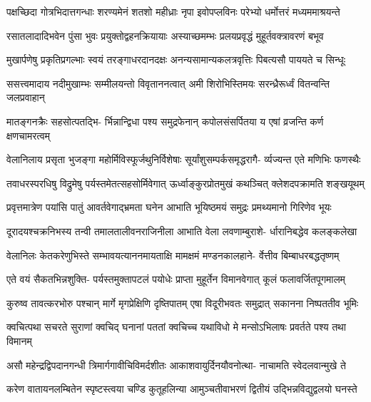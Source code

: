 \fourlineindentedshloka
{पक्षच्छिदा गोत्रभिदात्तगन्धाः}
{शरण्यमेनं शतशो महीध्राः}
{नृपा इवोपप्लविनः परेभ्यो}
{धर्मोत्तरं मध्यममाश्रयन्ते} %

\fourlineindentedshloka
{रसातलादादिभवेन पुंसा}
{भुवः प्रयुक्तोद्वहनक्रियायाः}
{अस्याच्छमम्भः प्रलयप्रवृद्धं}
{मुहूर्तवक्त्रावरणं बभूव} %

\fourlineindentedshloka
{मुखार्पणेषु प्रकृतिप्रगल्भाः}
{स्वयं तरङ्गाधरदानदक्षः}
{अनन्यसामान्यकलत्रवृत्तिः}
{पिबत्यसौ पाययते च सिन्धूः} %

\twolineshloka
{ससत्त्वमादाय नदीमुखाम्भः सम्मीलयन्तो विवृताननत्वात्}
{अमी शिरोभिस्तिमयः सरन्ध्रैरूर्ध्वं वितन्वन्ति जलप्रवाहान्} %

\fourlineindentedshloka
{मातङ्गनक्रैः सहसोत्पतद्भि-}
{र्भिन्नान्द्विधा पश्य समुद्रफेनान्}
{कपोलसंसर्पितया य एषां}
{व्रजन्ति कर्ण क्षणचामरत्वम्} %

\fourlineindentedshloka
{वेलानिलाय प्रसृता भुजङ्गा}
{महोर्मिविस्फूर्जथुनिर्विशेषाः}
{सूर्यांशुसम्पर्कसमृद्धरागै-}
{र्व्यज्यन्त एते मणिभिः फणस्थैः} %

\fourlineindentedshloka
{तवाधरस्परधिषु विद्रुमेषु}
{पर्यस्तमेतत्सहसोर्मिवेगात्}
{ऊर्ध्वाङ्कुरप्रोतमुखं कथञ्चित्}
{क्लेशदपक्रामति शङ्खयूथम्} %

\fourlineindentedshloka
{प्रवृत्तमात्रेण पयांसि पातुं}
{आवर्तवेगाद्भ्रमता घनेन}
{आभाति भूयिष्ठमयं समुद्रः}
{प्रमथ्यमानो गिरिणेव भूयः} %

\fourlineindentedshloka
{दूरादयश्चक्रनिभस्य तन्वी}
{तमालतालीवनराजिनीला}
{आभाति वेला लवणाम्बुराशे-}
{र्धारानिबद्धेव कलङ्कलेखा} %

\fourlineindentedshloka
{वेलानिलः केतकरेणुभिस्ते}
{सम्भावयत्याननमायताक्षि}
{मामक्षमं मण्डनकालहाने-}
{र्वेत्तीव बिम्बाधरबद्धतृष्णम्} %

\fourlineindentedshloka
{एते वयं सैकतभिन्नशुक्ति-}
{पर्यस्तमुक्तापटलं पयोधेः}
{प्राप्ता मुहूर्तेन विमानवेगात्}
{कूलं फलावर्जितपूगमालम्} %

\fourlineindentedshloka
{कुरुष्व तावत्करभोरु पश्चान्}
{मार्गे मृगप्रेक्षिणि दृष्तिपातम्}
{एषा विदूरीभवतः समुद्रात्}
{सकानना निष्पततीव भूमिः} %

\twolineshloka
{क्वचित्पथा सचरते सुराणां क्वचिद् घनानां पततां क्वचिच्च}
{यथाविधो मे मन्सोऽभिलाषः प्रवर्तते पश्य तथा विमानम्} %

\fourlineindentedshloka
{असौ महेन्द्रद्विपदानगन्धी}
{त्रिमार्गगावीचिविमर्दशीतः}
{आकाशवायुर्दिनयौवनोत्था-}
{नाचामति स्वेदलवान्मुखे ते} %

\fourlineindentedshloka
{करेण वातायनलम्बितेन}
{स्पृष्टस्त्वया चण्डि कुतूहलिन्या}
{आमुञ्चतीवाभरणं द्वितीयं}
{उद्भिन्नविद्युद्वलयो घनस्ते} %

